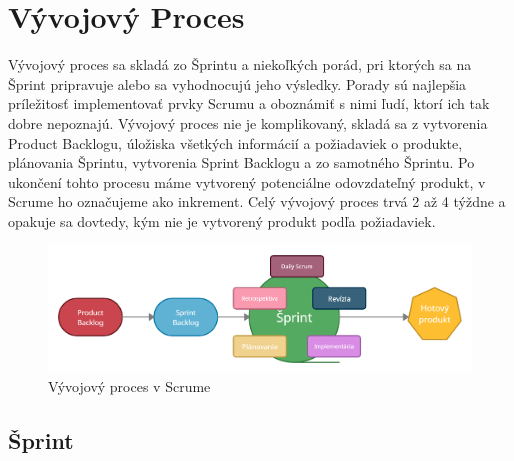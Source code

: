 \documentclass[10pt,slovak,a4paper]{article}
\begin{document}
\section{Vývojový Proces} \label{proces} 

Vývojový proces sa skladá zo Šprintu a niekoľkých porád, pri ktorých sa na Šprint pripravuje alebo sa vyhodnocujú jeho výsledky. Porady sú najlepšia príležitosť implementovať prvky Scrumu a oboznámiť s nimi ľudí, ktorí ich tak dobre nepoznajú. Vývojový proces nie je komplikovaný, skladá sa z vytvorenia Product Backlogu, úložiska všetkých informácií a požiadaviek o produkte, plánovania Šprintu, vytvorenia Sprint Backlogu a zo samotného Šprintu. Po ukončení tohto procesu máme vytvorený potenciálne odovzdateľný produkt, v Scrume ho označujeme ako inkrement. Celý vývojový proces trvá 2 až 4 týždne a opakuje sa dovtedy, kým nie je vytvorený produkt podľa požiadaviek.~\cite{techScrum} 

\begin {figure} [H]
\includegraphics[scale=0.22]{diagram.png} 
\caption{Vývojový proces v Scrume\cite{wrike}}
\label{fig1}
\end {figure}

\subsection{Šprint}
\end{document}
